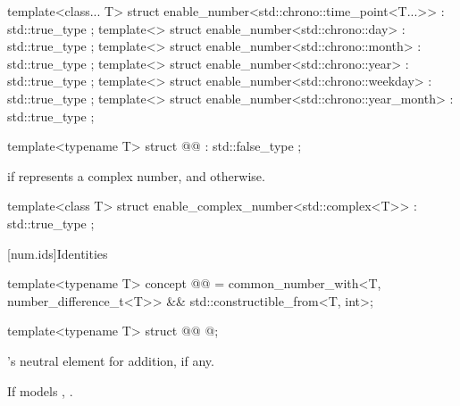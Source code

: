 %
%
%
%
%
%
\begin{itemdecl}
template<class... T>
struct enable_number<std::chrono::time_point<T...>> : std::true_type {};
template<>
struct enable_number<std::chrono::day> : std::true_type {};
template<>
struct enable_number<std::chrono::month> : std::true_type {};
template<>
struct enable_number<std::chrono::year> : std::true_type {};
template<>
struct enable_number<std::chrono::weekday> : std::true_type {};
template<>
struct enable_number<std::chrono::year_month> : std::true_type {};
\end{itemdecl}

\begin{itemdecl}
template<typename T>
struct @@ : std::false_type {};
\end{itemdecl}

\begin{itemdescr}
\pnum
\cvalue
{} if  represents a complex number, and
 otherwise.
\end{itemdescr}

%
\begin{itemdecl}
template<class T>
struct enable_complex_number<std::complex<T>> : std::true_type {};
\end{itemdecl}

[num.ids]{Identities}

\begin{codeblock}
template<typename T>
concept @@ =
  common_number_with<T, number_difference_t<T>> && std::constructible_from<T, int>;
\end{codeblock}

%
\begin{itemdecl}
template<typename T>
struct @@ { @\seebelow@ };
\end{itemdecl}

\begin{itemdescr}
\pnum
\cvalue
{}'s neutral element for addition, if any.

\pnum
\dvalue
If  models , .
\end{itemdescr}

